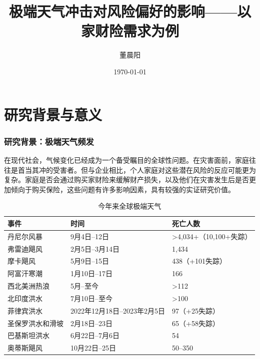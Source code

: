 \documentclass[a4paper,12pt]{ctexbeamer}
\title[开题报告]{极端天气冲击对风险偏好的影响——以家财险需求为例}
\author{董晨阳}
\date{\today}
\begin{document}
\maketitle
\section{研究背景与意义}
\begin{frame}
    \frametitle{研究背景：极端天气频发}

    在现代社会，气候变化已经成为一个备受瞩目的全球性问题。在灾害面前，家庭往往是首当其冲的受害者。但与企业相比，个人家庭对这些潜在风险的反应可能更为复杂。家庭是否会通过购买家财险来缓解财产损失，以及他们在灾害发生后是否更加倾向于购买保险，这些问题有许多影响因素，具有较强的实证研究价值。
    \begin{table}[H]
        \centering
        \caption{今年来全球极端天气}
        \tiny
        \begin{tabular}{lll}
            \toprule
            事件       & 时间                    & 死亡人数                            \\
            \midrule
            丹尼尔风暴    & 9月4日–12日              & \textgreater{}4,034+（10,100+失踪） \\
            弗雷迪飓风    & 2月5日–3月14日            & 1,434                           \\
            摩卡飓风     & 5月9日–15日              & 438（+101失踪）                     \\
            阿富汗寒潮    & 1月10日–17日             & 166                             \\
            西北美洲热浪   & 5月–至今                 & \textgreater{}112               \\
            北印度洪水    & 7月10日–至今              & \textgreater{}100               \\
            菲律宾洪水    & 2022年12月18日–2023年2月5日 & 97（+25失踪）                       \\
            圣保罗洪水和滑坡 & 2月18日–23日             & 65（+58失踪）                       \\
            巴基斯坦洪水   & 6月22日–7月6日            & 54                              \\
            奥蒂斯飓风    & 10月22日–25日            & 50–350                          \\
            \bottomrule
        \end{tabular}
    \end{table}
\end{frame}
\end{document}
